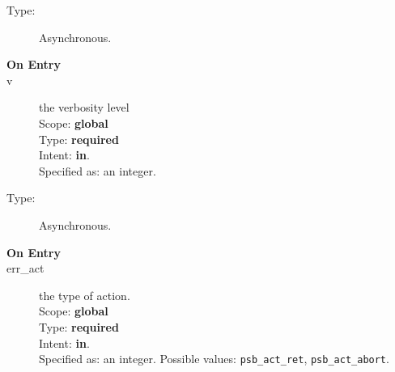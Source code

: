 
\begin{description}
\item[Type:] Asynchronous.
\item[\bf On Entry]
\item[v] the verbosity level\\
Scope: {\bf global}\\
Type: {\bf required}\\
Intent: {\bf in}.\\
Specified as: an integer.
\end{description}



\begin{description}
\item[Type:] Asynchronous.
\item[\bf On Entry]
\item[err\_act] the type of action.\\
Scope: {\bf global} \\
Type: {\bf required}\\
Intent: {\bf in}.\\
Specified as: an integer. Possible values: \verb|psb_act_ret|,
\verb|psb_act_abort|. 
\end{description}






